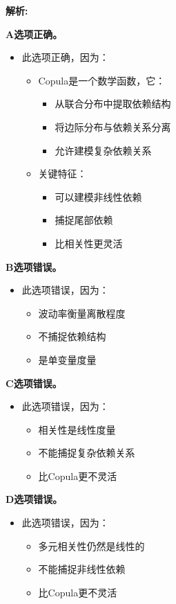 \documentclass{article}
\newenvironment{explanation}
{\textbf{解析:}\par}
{\par}
\begin{document}
\begin{explanation}
    \textbf{A选项正确。}
    \begin{itemize}
        \item 此选项正确，因为：
        \begin{itemize}
            \item Copula是一个数学函数，它：
            \begin{itemize}
                \item 从联合分布中提取依赖结构
                \item 将边际分布与依赖关系分离
                \item 允许建模复杂依赖关系
            \end{itemize}
            \item 关键特征：
            \begin{itemize}
                \item 可以建模非线性依赖
                \item 捕捉尾部依赖
                \item 比相关性更灵活
            \end{itemize}
        \end{itemize}
    \end{itemize}
    \textbf{B选项错误。}
    \begin{itemize}
        \item 此选项错误，因为：
        \begin{itemize}
            \item 波动率衡量离散程度
            \item 不捕捉依赖结构
            \item 是单变量度量
        \end{itemize}
    \end{itemize}
    \textbf{C选项错误。}
    \begin{itemize}
        \item 此选项错误，因为：
        \begin{itemize}
            \item 相关性是线性度量
            \item 不能捕捉复杂依赖关系
            \item 比Copula更不灵活
        \end{itemize}
    \end{itemize}
    \textbf{D选项错误。}
    \begin{itemize}
        \item 此选项错误，因为：
        \begin{itemize}
            \item 多元相关性仍然是线性的
            \item 不能捕捉非线性依赖
            \item 比Copula更不灵活
        \end{itemize}
    \end{itemize}
\end{explanation}
\end{document}
